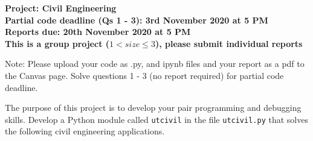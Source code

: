 \documentclass[a4paper,12pt]{article}
\begin{document}
\begin{centering}
	\textbf{
		Project: Civil Engineering\\
		Partial code deadline (Qs 1 - 3): 3rd November 2020 at 5 PM\\
		Reports due: 20th November 2020 at 5 PM\\
		This is a group project ($ 1 < size \le 3$), please submit individual reports\\
	}
\end{centering}


\vspace{1em}

Note: Please upload your code as .py, and ipynb files and your report as a pdf to the Canvas page. Solve questions 1 - 3 (no report required) for partial code deadline.

\vspace{1em}
 
 The purpose of this project is to develop your pair programming and debugging skills. Develop a Python module called \verb|utcivil| in the file  \verb|utcivil.py| that solves the following civil engineering applications.
 
\end{document}
